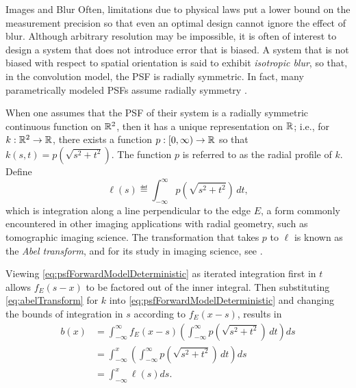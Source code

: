 \begin{chapter}{Images and Blur}
  Often, limitations due to physical laws put a lower bound on the measurement precision so that even an optimal design cannot ignore the effect of blur.
  Although arbitrary resolution may be impossible, it is often of interest to design a system that does not introduce error that is biased.
  A system that is not biased with respect to spatial orientation is said to exhibit \emph{isotropic blur}, so that, in the convolution model, the PSF is radially symmetric.
  In fact, many parametrically modeled PSFs assume radially symmetry \citep{doering1992,jain1989,kundur1996blind,watson1993}.  

  When one assumes that the PSF of their system is a radially symmetric continuous function on $\mathbb R^2$, then it has a unique representation on $\mathbb R$; i.e., for $k:\mathbb R^2 \to \mathbb R$, there exists a function $p:[0,\infty)\to \mathbb R$ so that $k(s,t) = p\left(\sqrt{s^2 + t^2}\right)$.  
  The function $p$ is referred to as the radial profile of $k$.
  Define
  \begin{equation} \label{eq:abelTransform}
    \ell(s) \eqdef \int_{-\infty}^\infty p\left(\sqrt{s^2 + t^2}\right)\,dt,
  \end{equation}
  which is integration along a line perpendicular to the edge $E$, a form commonly encountered in other imaging applications with radial geometry, such as tomographic imaging science.
  The transformation that takes $p$ to $\ell$ is known as the \emph{Abel transform}, and for its study in imaging science, see \citep{bracewell,epstein2008,knill93}.

  Viewing \eqref{eq:psfForwardModelDeterministic} as iterated integration first in $t$ allows $f_E(s-x)$ to be factored out of the inner integral. 
  Then substituting \eqref{eq:abelTransform} for $k$ into  \eqref{eq:psfForwardModelDeterministic} and changing the bounds of integration in $s$ according to $f_E(x-s)$, results in
  \begin{align}
    b(x) &= \int_{-\infty}^\infty f_E(x-s) \left(\int_{-\infty}^\infty p\left(\sqrt{s^2 + t^2}\right)\,dt\right)ds \nonumber \\
         &= \int_{-\infty}^x \left(\int_{-\infty}^\infty p\left(\sqrt{s^2 + t^2}\right)\,dt\right)ds \nonumber \\
         &= \int_{-\infty}^x \ell(s)ds. \label{eq:abelForward}
  \end{align}


\end{chapter}
